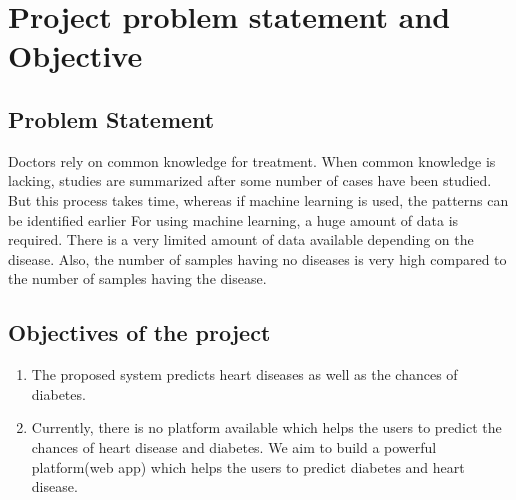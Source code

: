 \documentclass[oneside,12pt]{Classes/VTU}
\begin{document}
   	\section{Project problem statement and Objective}
   
   	\subsection{Problem Statement}
   	Doctors rely on common knowledge for treatment. When common knowledge is lacking, studies are summarized after some number of cases have been studied. But this process takes time, whereas if machine learning is used, the patterns can be identified earlier
   	For using machine learning, a huge amount of data is required. There is a very limited amount of data available depending on the disease. Also, the number of samples having no diseases is very high compared to the number of samples having the disease.
   	
   	\subsection{Objectives of the project}
   	\begin{enumerate}
   		\item The proposed system predicts heart diseases as well as the chances of diabetes.
   		\item Currently, there is no platform available which helps the users to predict the chances of heart disease and diabetes. We aim to build a powerful platform(web app) which helps the users to predict diabetes and heart disease.
   	\end{enumerate}
   
   
\end{document}
